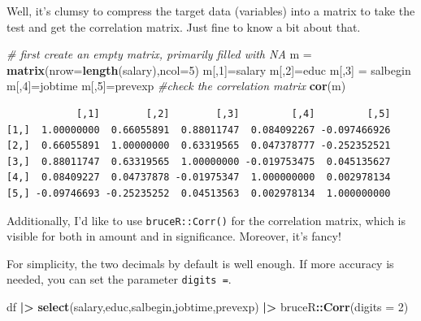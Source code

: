 \documentclass[
]{ctexart}
\newenvironment{Shaded}{\begin{snugshade}}{\end{snugshade}}
\newcommand{\AttributeTok}[1]{\textcolor[rgb]{0.13,0.29,0.53}{#1}}
\newcommand{\CommentTok}[1]{\textcolor[rgb]{0.56,0.35,0.01}{\textit{#1}}}
\newcommand{\DecValTok}[1]{\textcolor[rgb]{0.00,0.00,0.81}{#1}}
\newcommand{\FunctionTok}[1]{\textcolor[rgb]{0.13,0.29,0.53}{\textbf{#1}}}
\newcommand{\NormalTok}[1]{#1}
\newcommand{\OtherTok}[1]{\textcolor[rgb]{0.56,0.35,0.01}{#1}}
\newcommand{\SpecialCharTok}[1]{\textcolor[rgb]{0.81,0.36,0.00}{\textbf{#1}}}
\begin{document}
Well, it's clumsy to compress the target data (variables) into a matrix
to take the test and get the correlation matrix. Just fine to know a bit
about that.

\begin{Shaded}
\begin{Highlighting}[]
\CommentTok{\# first create an empty matrix, primarily filled with NA}
\NormalTok{m }\OtherTok{=} \FunctionTok{matrix}\NormalTok{(}\AttributeTok{nrow=}\FunctionTok{length}\NormalTok{(salary),}\AttributeTok{ncol=}\DecValTok{5}\NormalTok{)}
\NormalTok{m[,}\DecValTok{1}\NormalTok{]}\OtherTok{=}\NormalTok{salary}
\NormalTok{m[,}\DecValTok{2}\NormalTok{]}\OtherTok{=}\NormalTok{educ}
\NormalTok{m[,}\DecValTok{3}\NormalTok{] }\OtherTok{=}\NormalTok{ salbegin}
\NormalTok{m[,}\DecValTok{4}\NormalTok{]}\OtherTok{=}\NormalTok{jobtime  }
\NormalTok{m[,}\DecValTok{5}\NormalTok{]}\OtherTok{=}\NormalTok{prevexp}
\CommentTok{\#check the correlation matrix}
\FunctionTok{cor}\NormalTok{(m)}
\end{Highlighting}
\end{Shaded}

\begin{verbatim}
            [,1]        [,2]        [,3]         [,4]         [,5]
[1,]  1.00000000  0.66055891  0.88011747  0.084092267 -0.097466926
[2,]  0.66055891  1.00000000  0.63319565  0.047378777 -0.252352521
[3,]  0.88011747  0.63319565  1.00000000 -0.019753475  0.045135627
[4,]  0.08409227  0.04737878 -0.01975347  1.000000000  0.002978134
[5,] -0.09746693 -0.25235252  0.04513563  0.002978134  1.000000000
\end{verbatim}

Additionally, I'd like to use \texttt{bruceR::Corr()} for the
correlation matrix, which is visible for both in amount and in
significance. Moreover, it's fancy!

For simplicity, the two decimals by default is well enough. If more
accuracy is needed, you can set the parameter \texttt{digits\ =}.

\begin{Shaded}
\begin{Highlighting}[]
\NormalTok{df }\SpecialCharTok{|\textgreater{}} \FunctionTok{select}\NormalTok{(salary,educ,salbegin,jobtime,prevexp) }\SpecialCharTok{|\textgreater{}}\NormalTok{ bruceR}\SpecialCharTok{::}\FunctionTok{Corr}\NormalTok{(}\AttributeTok{digits =} \DecValTok{2}\NormalTok{)}
\end{Highlighting}
\end{Shaded}
\end{document}
